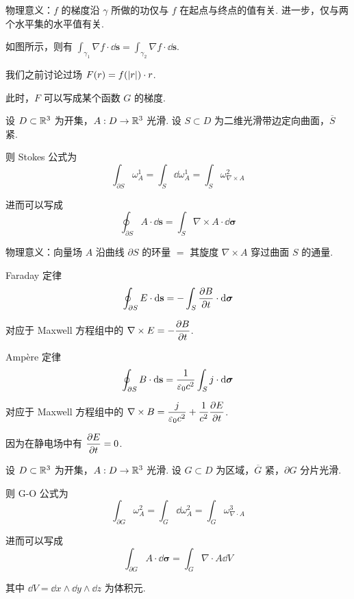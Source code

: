 \textcolor{mydarkblue}{物理意义：}$f$ 的梯度沿 $\gamma$ 所做的功仅与 $f$ 在起点与终点的值有关. 进一步，仅与两个水平集的水平值有关.


如图所示，则有 $\displaystyle\int_{\gamma_1}\nabla f\cdot\dd\mathbf{s}=\int_{\gamma_2}\nabla f\cdot\dd\mathbf{s}$.

\begin{example}
    我们之前讨论过场 $F(r)=f(\lvert{r}\rvert)\cdot r$.

    此时，$F$ 可以写成某个函数 $G$ 的梯度.
\end{example}


\begin{theorem}
    设 $D\subset\mathbb{R}^3$ 为开集，$A:D\to\mathbb{R}^3$ 光滑. 设 $S\subset D$ 为二维光滑带边定向曲面，$\overline{S}$ 紧.
    
    则 Stokes 公式为
$$
\int_{\partial S}\omega_A^1=\int_S\dd\omega_A^1=\int_S\omega_{\nabla\times A}^2
$$

    进而可以写成
$$
\oint_{\partial S}A\cdot\dd\mathbf{s}=\int_S\nabla\times A\cdot\dd\bm{\sigma}
$$
\end{theorem}

\textcolor{mydarkblue}{物理意义：}向量场 $A$ 沿曲线 $\partial S$ 的环量 $=$ 其旋度 $\nabla\times A$ 穿过曲面 $S$ 的通量.


\begin{example}
    Faraday 定律
$$
\oint_{\partial S} E\cdot\mathrm{d}\mathbf{s}=-\int_S\frac{\partial{B}}{\partial{t}}\cdot\mathrm{d}\bm{\sigma}
$$

    对应于 Maxwell 方程组中的 $\displaystyle\nabla\times E=-\frac{\partial{B}}{\partial{t}}$.
\end{example}

\begin{example}
    Ampère 定律
$$
\oint_{\partial S}B\cdot\mathrm{d}\mathbf{s}=\frac{1}{\varepsilon_0c^2}\int_S j\cdot\mathrm{d}\bm{\sigma}
$$

    对应于 Maxwell 方程组中的 $\displaystyle\nabla\times B=\frac{j}{\varepsilon_0c^2}+\frac{1}{c^2}\frac{\partial{E}}{\partial{t}}$.

    因为在静电场中有 $\displaystyle\frac{\partial{E}}{\partial{t}}=0$.
\end{example}


\begin{theorem}
    设 $D\subset\mathbb{R}^3$ 为开集，$A:D\to\mathbb{R}^3$ 光滑. 设 $G\subset D$ 为区域，$\overline G$ 紧，$\partial G$ 分片光滑.

    则 G-O 公式为
$$
\int_{\partial G}\omega_A^2=\int_G\dd\omega_A^2=\int_G\omega_{\nabla\cdot A}^3
$$

    进而可以写成
$$
\int_{\partial G}A\cdot\dd\bm{\sigma}=\int_G\nabla\cdot A\dd V
$$

    其中 $\dd V=\dd x\wedge\dd y\wedge\dd z$ 为体积元.
\end{theorem}

